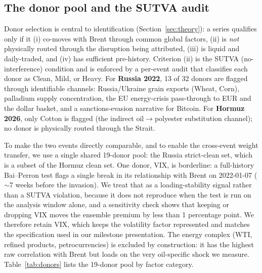 \documentclass[11pt,a4paper]{article}
\begin{document}
\subsection{The donor pool and the SUTVA audit}
Donor selection is central to identification (Section~\ref{sec:theory}): a series
qualifies only if it (i) co-moves with Brent through common global factors, (ii) is
\emph{not} physically routed through the disruption being attributed, (iii) is liquid
and daily-traded, and (iv) has sufficient pre-history. Criterion (ii) is the SUTVA
(no-interference) condition and is enforced by a per-event audit that classifies each
donor as Clean, Mild, or Heavy. For \textbf{Russia 2022}, 13 of 32 donors are flagged
through identifiable channels: Russia/Ukraine grain exports (Wheat, Corn), palladium
supply concentration, the EU energy-crisis pass-through to EUR and the dollar basket,
and a sanctions-evasion narrative for Bitcoin. For \textbf{Hormuz 2026}, only Cotton is
flagged (the indirect oil$\to$polyester substitution channel); no donor is physically
routed through the Strait.

To make the two events directly comparable, and to enable the cross-event weight
transfer, we use a single shared 19-donor pool: the Russia strict-clean set, which is
a subset of the Hormuz clean set. One donor, VIX, is borderline: a full-history
Bai--Perron test \citep{baiperron1998} flags a single break in its relationship with
Brent on 2022-01-07 ($\sim$7 weeks before the invasion). We treat that as a
loading-stability signal rather than a SUTVA violation, because it does not reproduce
when the test is run on the analysis window alone, and a sensitivity check shows that
keeping or dropping VIX moves the ensemble premium by less than 1 percentage point. We
therefore retain VIX, which keeps the volatility factor represented and matches the
specification used in our milestone presentation. The energy complex (WTI, refined
products, petrocurrencies) is excluded by construction: it has the highest raw
correlation with Brent but loads on the very oil-specific shock we measure.
Table~\ref{tab:donors} lists the 19-donor pool by factor category.
\end{document}
